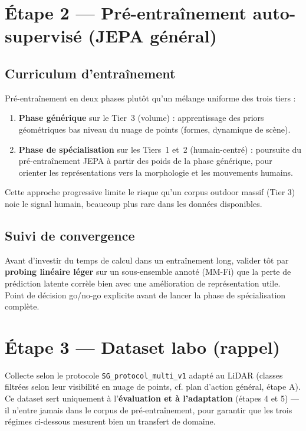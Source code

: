 \documentclass[11pt]{article}
\begin{document}
\section{Étape 2 --- Pré-entraînement auto-supervisé (JEPA général)}

\subsection{Curriculum d'entraînement}

Pré-entraînement en deux phases plutôt qu'un mélange uniforme des trois tiers :
\begin{enumerate}
    \item \textbf{Phase générique} sur le Tier~3 (volume) : apprentissage des priors
    géométriques bas niveau du nuage de points (formes, dynamique de scène).
    \item \textbf{Phase de spécialisation} sur les Tiers~1 et~2 (humain-centré) : poursuite du
    pré-entraînement JEPA à partir des poids de la phase générique, pour orienter les
    représentations vers la morphologie et les mouvements humains.
\end{enumerate}
Cette approche progressive limite le risque qu'un corpus outdoor massif (Tier 3) noie le
signal humain, beaucoup plus rare dans les données disponibles.

\subsection{Suivi de convergence}

Avant d'investir du temps de calcul dans un entraînement long, valider tôt par
\textbf{probing linéaire léger} sur un sous-ensemble annoté (MM-Fi) que la perte de
prédiction latente corrèle bien avec une amélioration de représentation utile. Point de
décision go/no-go explicite avant de lancer la phase de spécialisation complète.

\section{Étape 3 --- Dataset labo (rappel)}

Collecte selon le protocole \texttt{SG\_protocol\_multi\_v1} adapté au LiDAR (classes filtrées
selon leur visibilité en nuage de points, cf. plan d'action général, étape A). Ce dataset sert
uniquement à l'\textbf{évaluation et à l'adaptation} (étapes 4 et 5) --- il n'entre jamais dans
le corpus de pré-entraînement, pour garantir que les trois régimes ci-dessous mesurent bien un
transfert de domaine.
\end{document}
